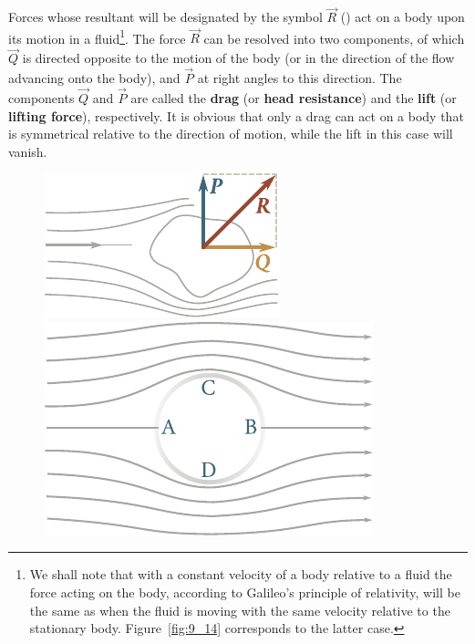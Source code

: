 Forces whose resultant will be designated by the symbol $\vec{R}$ () act on a body upon its motion in a fluid\footnote{We shall note that with a constant velocity of a body relative to a fluid the force acting on the body, according to Galileo's principle of relativity, will be the same as when the fluid is moving with the same velocity relative to the stationary body. Figure~\ref{fig:9_14} corresponds to the latter case.}. The force $\vec{R}$ can be resolved into two components, of which $\vec{Q}$ is directed opposite to the motion of the body (or in the direction of the flow advancing onto the body), and $\vec{P}$ at right angles to this direction. The components $\vec{Q}$ and $\vec{P}$ are called the \textbf{drag} (or \textbf{head resistance}) and the \textbf{lift} (or \textbf{lifting force}), respectively. It is obvious that only a drag can act on a body that is symmetrical relative to the direction of motion, while the lift in this case will vanish.

\begin{figure}[t]
	\begin{minipage}[t]{0.4\linewidth}
		\begin{center}
			\includegraphics[scale=1.0]{figures/ch_09/fig_9_14.pdf}
			\caption[]{}
			\label{fig:9_14}
		\end{center}
	\end{minipage}
	\hspace{-0.0cm}
	\begin{minipage}[t]{0.6\linewidth}
		\begin{center}
			\includegraphics[scale=1.0]{figures/ch_09/fig_9_15.pdf}
			\caption[]{}
			\label{fig:9_15}
		\end{center}
	\end{minipage}
	\vspace{-0.4cm}
\end{figure}

